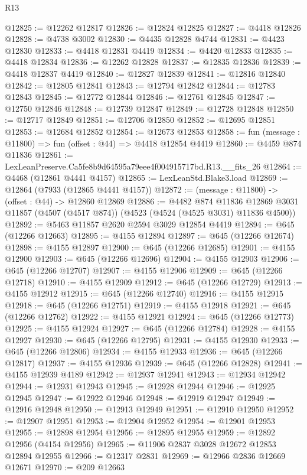 \begin{lexlean}{R13}
\begin{coremodule}
@12825 := @12262 @12817
@12826 := @12824 @12825
@12827 := @4418 @12826
@12828 := @4738 @3002
@12830 := @4435 @12828 @4744
@12831 := @4423 @12830
@12833 := @4418 @12831 @4419
@12834 := @4420 @12833
@12835 := @4418 @12834
@12836 := @12262 @12828
@12837 := @12835 @12836
@12839 := @4418 @12837 @4419
@12840 := @12827 @12839
@12841 := @12816 @12840
@12842 := @12805 @12841
@12843 := @12794 @12842
@12844 := @12783 @12843
@12845 := @12772 @12844
@12846 := @12761 @12845
@12847 := @12750 @12846
@12848 := @12739 @12847
@12849 := @12728 @12848
@12850 := @12717 @12849
@12851 := @12706 @12850
@12852 := @12695 @12851
@12853 := @12684 @12852
@12854 := @12673 @12853
@12858 := fun (message : @11800) => fun (offset : @44) => @4418 @12854 @4419
@12860 := @4459 @874 @11836
@12861 := LexLeanPreserve.Ca5fe8b9d64595a79eee4f004915717bd.R13.__fits_26
@12864 := @4468 (@12861 @4441 @4157)
@12865 := LexLeanStd.Blake3.load
@12869 := @12864 (@7933 (@12865 @4441 @4157))
@12872 := (message : @11800) -> (offset : @44) -> @12860 @12869
@12886 := @4482
    @874
    @11836
    @12869
    @3031
    @11857
    (@4507 (@4517 @874))
    (@4523 (@4524 (@4525 @3031) @11836 @4500))
@12892 := @5463 @11857 @2620 @2594 @3029 @12854 @4419
@12894 := @645 (@12266 @12663)
@12895 := @4155 @12894
@12897 := @645 (@12266 @12674)
@12898 := @4155 @12897
@12900 := @645 (@12266 @12685)
@12901 := @4155 @12900
@12903 := @645 (@12266 @12696)
@12904 := @4155 @12903
@12906 := @645 (@12266 @12707)
@12907 := @4155 @12906
@12909 := @645 (@12266 @12718)
@12910 := @4155 @12909
@12912 := @645 (@12266 @12729)
@12913 := @4155 @12912
@12915 := @645 (@12266 @12740)
@12916 := @4155 @12915
@12918 := @645 (@12266 @12751)
@12919 := @4155 @12918
@12921 := @645 (@12266 @12762)
@12922 := @4155 @12921
@12924 := @645 (@12266 @12773)
@12925 := @4155 @12924
@12927 := @645 (@12266 @12784)
@12928 := @4155 @12927
@12930 := @645 (@12266 @12795)
@12931 := @4155 @12930
@12933 := @645 (@12266 @12806)
@12934 := @4155 @12933
@12936 := @645 (@12266 @12817)
@12937 := @4155 @12936
@12939 := @645 (@12266 @12828)
@12941 := @4155 @12939 @4189
@12942 := @12937 @12941
@12943 := @12934 @12942
@12944 := @12931 @12943
@12945 := @12928 @12944
@12946 := @12925 @12945
@12947 := @12922 @12946
@12948 := @12919 @12947
@12949 := @12916 @12948
@12950 := @12913 @12949
@12951 := @12910 @12950
@12952 := @12907 @12951
@12953 := @12904 @12952
@12954 := @12901 @12953
@12955 := @12898 @12954
@12956 := @12895 @12955
@12959 := @12892 @12956 (@4154 @12956)
@12965 := @11906 @2837 @3028 @12672 @12853 @12894 @12955
@12966 := @12317 @2831
@12969 := @12966 @2836 @12669 @12671
@12970 := @209 @12663

\end{coremodule}
\end{lexlean}
